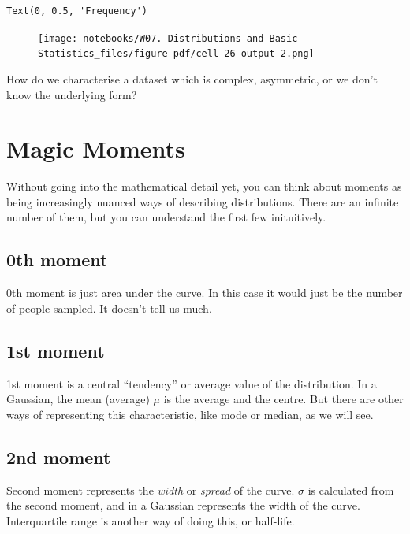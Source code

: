 \documentclass[
  letterpaper,
  DIV=11,
  numbers=noendperiod]{scrreprt}
\begin{document}
\begin{verbatim}
Text(0, 0.5, 'Frequency')
\end{verbatim}

\begin{figure}[H]

{\centering \texttt{[image: notebooks/W07. Distributions and Basic Statistics\_files/figure-pdf/cell-26-output-2.png]}

}

\end{figure}

How do we characterise a dataset which is complex, asymmetric, or we
don't know the underlying form?


\hypertarget{magic-moments}{%
\chapter{Magic Moments}\label{magic-moments}}

Without going into the mathematical detail yet, you can think about
moments as being increasingly nuanced ways of describing distributions.
There are an infinite number of them, but you can understand the first
few inituitively.

\hypertarget{th-moment}{%
\section{0th moment}\label{th-moment}}

0th moment is just area under the curve. In this case it would just be
the number of people sampled. It doesn't tell us much.

\hypertarget{st-moment}{%
\section{1st moment}\label{st-moment}}

1st moment is a central ``tendency'' or average value of the
distribution. In a Gaussian, the mean (average) \(\mu\) is the average
and the centre. But there are other ways of representing this
characteristic, like mode or median, as we will see.

\hypertarget{nd-moment}{%
\section{2nd moment}\label{nd-moment}}

Second moment represents the \emph{width} or \emph{spread} of the curve.
\(\sigma\) is calculated from the second moment, and in a Gaussian
represents the width of the curve. Interquartile range is another way of
doing this, or half-life.
\end{document}
